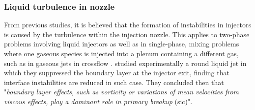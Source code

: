 \subsubsection*{Liquid turbulence in nozzle}

From previous studies, it is believed that the formation of instabilities in injectors is caused by the turbulence within the injection nozzle. This applies to two-phase problems involving liquid injectors 
as well as in single-phase, mixing problems where one gaseous species is injected into a plenum containing a different gas, such as in gaseous jets in crossflow . \citeColor[wu_effects_1994] studied experimentally a round liquid jet in which they suppressed the boundary layer at the injector exit, finding that interface instabilities are reduced in such case. They concluded then that "\textsl{boundary layer effects, such as vorticity or variations of mean velocities from viscous effects, play a dominant role in primary breakup} (sic)".

